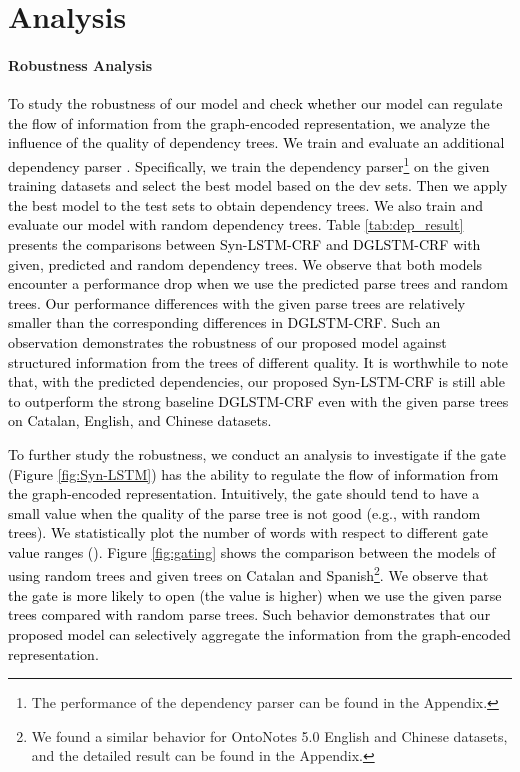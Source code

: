 \documentclass[11pt]{article}
\begin{document}
\section{Analysis}
\paragraph{Robustness  Analysis}
\textcolor{black}{
To study the robustness of our model and check whether our model can regulate the flow of information from the graph-encoded representation, we analyze the influence of the quality of dependency trees. We train and evaluate an additional dependency parser \cite{dozat2017deep}. Specifically, we train the dependency parser\footnote{The performance of the dependency parser can be found in the Appendix.} on the given training datasets and select the best model based on the dev sets. Then we apply the best model to the test sets to obtain dependency trees. We also train and evaluate our model with random dependency trees. 
Table \ref{tab:dep_result} presents the comparisons between Syn-LSTM-CRF and DGLSTM-CRF with given, predicted and random dependency trees.
We observe that both models encounter a performance drop when we use the predicted parse trees and random trees. 
Our performance differences with the given parse trees are relatively smaller than the corresponding differences in DGLSTM-CRF.
Such an observation demonstrates the robustness of our proposed model against structured information from the trees of different quality.
It is worthwhile to note that, with the predicted dependencies, our proposed Syn-LSTM-CRF is still able to outperform the strong baseline DGLSTM-CRF even with the given parse trees on Catalan, English, and Chinese datasets.}


\textcolor{black}{
To further study the robustness, we conduct an analysis to investigate if the gate  (Figure \ref{fig:Syn-LSTM}) has the  ability to regulate the flow of information from the graph-encoded representation.
Intuitively, the gate  {\color{black}should tend} to have a small value when the quality of the parse tree is not good (e.g., with random trees). 
We statistically plot the number of words with respect to different gate value ranges ().
Figure \ref{fig:gating} shows the comparison between the models of using random trees and given trees on Catalan and Spanish\footnote{We found a similar behavior for OntoNotes 5.0 English and Chinese datasets, and the detailed result can be found in the Appendix.}. 
We observe that the gate  is more likely to open (the value is higher) when we use the given parse trees compared with random parse trees. 
Such behavior demonstrates that our proposed model can selectively aggregate the information from the graph-encoded representation.}
\end{document}

